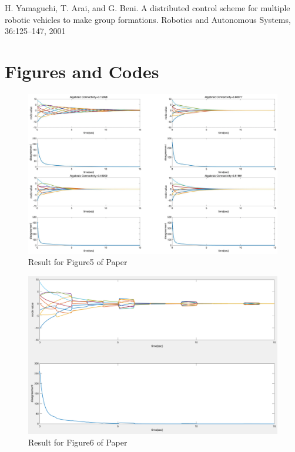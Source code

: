 \documentclass{article}
\begin{document}
\noindent [25] H. Yamaguchi, T. Arai, and G. Beni. A distributed control scheme for multiple robotic vehicles to make group formations. Robotics and Autonomous Systems, 36:125–147, 2001


\section*{Figures and Codes}

\begin{figure}[htbp]
    \centering
    \includegraphics[width=14.5cm]{figures/UserFig5.png}
    \caption{Result for Figure5 of Paper}
    \label{UserFig5}
\end{figure}

\begin{figure}[htbp]
    \centering
    \includegraphics[width=14.5cm]{figures/UserFig6.png}
    \caption{Result for Figure6 of Paper}
    \label{UserFig5}
\end{figure}
\end{document}
